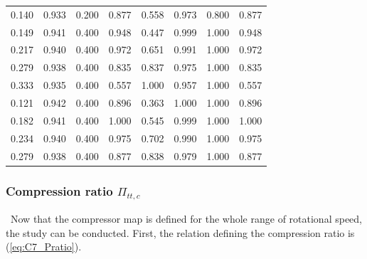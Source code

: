 \begin{longtable}[c]{@{}cccc|cccc@{}}
0.140                            & 0.933                      & 0.200                 & 0.877                       & 0.558                            & 0.973                      & 0.800                 & 0.877                       \\
0.149                            & 0.941                      & 0.400                 & 0.948                       & 0.447                            & 0.999                      & 1.000                 & 0.948                       \\
0.217                            & 0.940                      & 0.400                 & 0.972                       & 0.651                            & 0.991                      & 1.000                 & 0.972                       \\
0.279                            & 0.938                      & 0.400                 & 0.835                       & 0.837                            & 0.975                      & 1.000                 & 0.835                       \\
0.333                            & 0.935                      & 0.400                 & 0.557                       & 1.000                            & 0.957                      & 1.000                 & 0.557                       \\
0.121                            & 0.942                      & 0.400                 & 0.896                       & 0.363                            & 1.000                      & 1.000                 & 0.896                       \\
0.182                            & 0.941                      & 0.400                 & 1.000                       & 0.545                            & 0.999                      & 1.000                 & 1.000                       \\
0.234                            & 0.940                      & 0.400                 & 0.975                       & 0.702                            & 0.990                      & 1.000                 & 0.975                       \\
0.279                            & 0.938                      & 0.400                 & 0.877                       & 0.838                            & 0.979                      & 1.000                 & 0.877                       \\* \bottomrule
\end{longtable}
\subsubsection{Compression ratio $\Pi_{tt,c}$}
\quad\ Now that the compressor map is defined for the whole range of rotational speed, the study can be conducted. First, the relation defining the compression ratio is (\ref{eq:C7_Pratio}).

